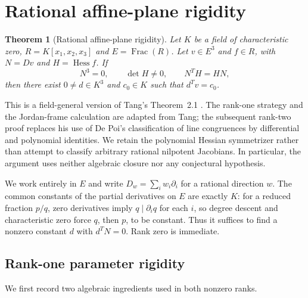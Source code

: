 \documentclass[11pt,a4paper]{article}
\newtheorem{theorem}{Theorem}[section]
\newcommand{\Hess}{\operatorname{Hess}}
\begin{document}
\section{Rational affine-plane rigidity}\label{sec:rigidity}

\begin{theorem}[Rational affine-plane rigidity]\label{thm:main}
Let $K$ be a field of characteristic zero, $R=K[x_1,x_2,x_3]$ and $E=\operatorname{Frac}(R)$. Let $v\in E^3$ and $f\in R$, with $N=Dv$ and $H=\Hess f$. If
\begin{equation}\label{eq:nil}
 N^3=0,\qquad \det H\ne0,\qquad N^TH=HN,
\end{equation}
then there exist $0\ne d\in K^3$ and $c_0\in K$ such that $d^Tv=c_0$.
\end{theorem}
This is a field-general version of Tang's Theorem~2.1 \cite{tang}. The rank-one strategy and the Jordan-frame calculation are adapted from Tang; the subsequent rank-two proof replaces his use of De Poi's classification of line congruences \cite{depoi} by differential and polynomial identities. We retain the polynomial Hessian symmetrizer rather than attempt to classify arbitrary rational nilpotent Jacobians. In particular, the argument uses neither algebraic closure nor any conjectural hypothesis.

We work entirely in $E$ and write $D_w=\sum_i w_i\partial_i$ for a rational direction $w$. The common constants of the partial derivatives on $E$ are exactly $K$: for a reduced fraction $p/q$, zero derivatives imply $q\mid\partial_i q$ for each $i$, so degree descent and characteristic zero force $q$, then $p$, to be constant. Thus it suffices to find a nonzero constant $d$ with $d^TN=0$. Rank zero is immediate.

\subsection{Rank-one parameter rigidity}\label{sec:rankone}
We first record two algebraic ingredients used in both nonzero ranks.
\end{document}
